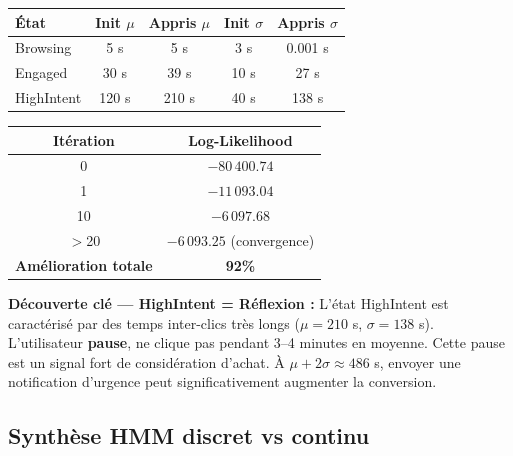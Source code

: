 \documentclass[11pt,a4paper]{article}
\begin{document}
\begin{center}
\begin{tabular}{lcccc}
\toprule
\textbf{État} & Init $\mu$ & \textbf{Appris $\mu$} & Init $\sigma$ & \textbf{Appris $\sigma$} \\
\midrule
\rowcolor{LightBlue}   Browsing   & 5 s   & 5 s    & 3 s   & 0.001 s \\
\rowcolor{LightOrange} Engaged    & 30 s  & 39 s   & 10 s  & 27 s    \\
\rowcolor{LightRed}    HighIntent & 120 s & 210 s  & 40 s  & 138 s   \\
\bottomrule
\end{tabular}
\end{center}

\begin{center}
\begin{tabular}{cc}
\toprule
\textbf{Itération} & \textbf{Log-Likelihood} \\
\midrule
0        & $-80\,400.74$ \\
1        & $-11\,093.04$ \\
10       & $-6\,097.68$ \\
$>$20    & $-6\,093.25$ (convergence) \\
\midrule
\textbf{Amélioration totale} & \textbf{92\%} \\
\bottomrule
\end{tabular}
\end{center}

\begin{ecoBiz}
\textbf{Découverte clé --- HighIntent = Réflexion :}
L'état HighIntent est caractérisé par des temps inter-clics très longs ($\mu = 210$ s,
$\sigma = 138$ s). L'utilisateur \textbf{pause}, ne clique pas pendant 3--4 minutes en moyenne.
Cette pause est un signal fort de considération d'achat.
À $\mu + 2\sigma \approx 486$ s, envoyer une notification d'urgence peut significativement
augmenter la conversion.
\end{ecoBiz}

\subsection{Synthèse HMM discret vs continu}
\end{document}
